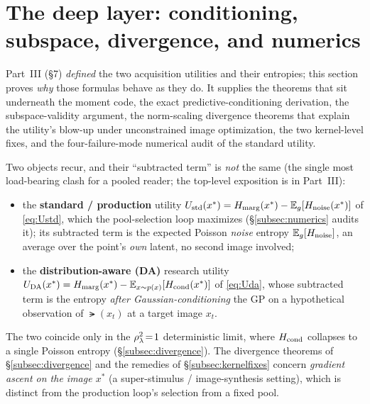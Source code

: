 
\section{The deep layer: conditioning, subspace, divergence, and numerics}
\label{sec:deeplayer}

Part~III (\S7) \emph{defined} the two acquisition utilities and their entropies;
this section proves \emph{why} those formulas behave as they do. It supplies the
theorems that sit underneath the moment code, the exact predictive-conditioning
derivation, the subspace-validity argument, the norm-scaling divergence theorems
that explain the utility's blow-up under unconstrained image optimization, the
two kernel-level fixes, and the four-failure-mode numerical audit of the standard
utility.

Two objects recur, and their ``subtracted term'' is \emph{not} the same (the
single most load-bearing clash for a pooled reader; the top-level exposition is
in Part~III):
\begin{itemize}[leftmargin=1.4em]
  \item the \textbf{standard / production} utility
        $U_{\mathrm{std}}(x^*)=H_{\mathrm{marg}}(x^*)-\mathbb{E}_{g}[H_{\mathrm{noise}}(x^*)]$ of \eqref{eq:Ustd},
        which the pool-selection loop maximizes (\S\ref{subsec:numerics} audits
        it); its subtracted term is the expected Poisson \emph{noise} entropy
        $\mathbb{E}_{g}[H_{\mathrm{noise}}]$, an average over the point's \emph{own} latent, no
        second image involved;
  \item the \textbf{distribution-aware (DA)} research utility
        $U_{\mathrm{DA}}(x^*)=H_{\mathrm{marg}}(x^*)-\mathbb{E}_{x\sim p(x)}[H_{\mathrm{cond}}(x^*)]$ of \eqref{eq:Uda},
        whose subtracted term is the entropy \emph{after Gaussian-conditioning}
        the GP on a hypothetical observation of $\lat(x_t)$ at a target image
        $x_t$.
\end{itemize}
The two coincide only in the $\rho_{\lambda}^2\!=\!1$ deterministic limit, where $H_{\mathrm{cond}}$
collapses to a single Poisson entropy (\S\ref{subsec:divergence}). The divergence
theorems of \S\ref{subsec:divergence} and the remedies of
\S\ref{subsec:kernelfixes} concern \emph{gradient ascent on the image $x^*$}
(a super-stimulus / image-synthesis setting), which is distinct from the
production loop's selection from a fixed pool.

